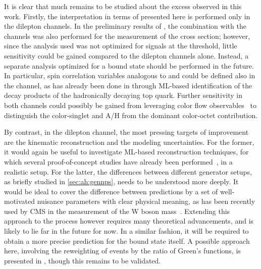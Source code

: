 It is clear that much remains to be studied about the excess observed in this work. Firstly, the interpretation in terms of \etat presented here is performed only in the dilepton channels. In the preliminary results of , the combination with the \ljets channels was also performed for the measurement of the \etat cross section; however, since the \ljets analysis used was not optimized for signals at the \ttbar threshold, little sensitivity could be gained compared to the dilepton channels alone. Instead, a separate \ljets analysis optimized for a \ttbar bound state should be performed in the future. In particular, spin correlation variables analogous to \chel and \chan could be defined also in the \ljets channel, as has already been done in  through ML-based identification of the decay products of the hadronically decaying top quark.
Further sensitivity in both channels could possibly be gained from leveraging color flow observables~\cite{Gallicchio:2010sw,ATLAS:2018olo} to distinguish the color-singlet \etat and A/H from the dominant color-octet \ttbar contribution.

By contrast, in the dilepton channel, the most pressing targets of improvement are the kinematic reconstruction and the \ttbar modeling uncertainties. For the former, it would again be useful to investigate ML-based reconstruction techniques, for which several proof-of-concept studies have already been performed~\cite{Rubenach:PhD,Raine:2023fko}, in a realistic setup. For the latter, the differences between different generator setups, as briefly studied in \cref{sec:ah:gennps}, needs to be understood more deeply. It would be ideal to cover the difference between predictions by a set of well-motivated nuisance parameters with clear physical meaning, as has been recently used by CMS in the measurement of the W boson mass~\cite{CMS:SMP-23-002,Tackmann:2024kci}. Extending this approach to the \ttbar process however requires many theoretical advancements, and is likely to lie far in the future for now. In a similar fashion, it will be required to obtain a more precise prediction for the \ttbar bound state itself. A possible approach here, involving the reweighting of \ttbar events by the ratio of Green's functions, is presented in , though this remains to be validated.


